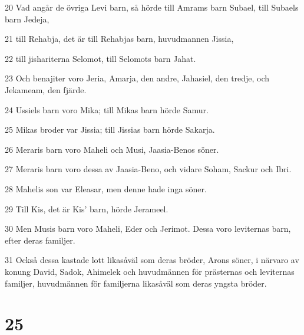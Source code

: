 \par 20 Vad angår de övriga Levi barn, så hörde till Amrams barn Subael, till Subaels barn Jedeja,
\par 21 till Rehabja, det är till Rehabjas barn, huvudmannen Jissia,
\par 22 till jishariterna Selomot, till Selomots barn Jahat.
\par 23 Och benajiter voro Jeria, Amarja, den andre, Jahasiel, den tredje, och Jekameam, den fjärde.
\par 24 Ussiels barn voro Mika; till Mikas barn hörde Samur.
\par 25 Mikas broder var Jissia; till Jissias barn hörde Sakarja.
\par 26 Meraris barn voro Maheli och Musi, Jaasia-Benos söner.
\par 27 Meraris barn voro dessa av Jaasia-Beno, och vidare Soham, Sackur och Ibri.
\par 28 Mahelis son var Eleasar, men denne hade inga söner.
\par 29 Till Kis, det är Kis' barn, hörde Jerameel.
\par 30 Men Musis barn voro Maheli, Eder och Jerimot. Dessa voro leviternas barn, efter deras familjer.
\par 31 Också dessa kastade lott likasåväl som deras bröder, Arons söner, i närvaro av konung David, Sadok, Ahimelek och huvudmännen för prästernas och leviternas familjer, huvudmännen för familjerna likasåväl som deras yngsta bröder.

\chapter{25}

